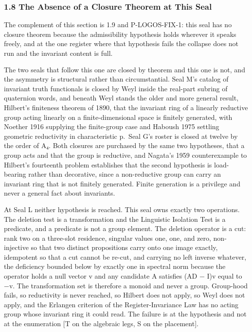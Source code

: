 \documentclass[10pt,twocolumn]{article}
\begin{document}
\hypertarget{the-absence-of-a-closure-theorem-at-this-seal}{%
\subsubsection{1.8 The Absence of a Closure Theorem at This
Seal}\label{the-absence-of-a-closure-theorem-at-this-seal}}

The complement of this section is 1.9 and P-LOGOS-FIX-1: this seal has
no closure theorem because the admissibility hypothesis holds wherever
it speaks freely, and at the one register where that hypothesis fails
the collapse does not run and the invariant content is full.

The two seals that follow this one are closed by theorem and this one is
not, and the asymmetry is structural rather than circumstantial. Seal
M's catalog of invariant truth functionals is closed by Weyl inside the
real-part subring of quaternion words, and beneath Weyl stands the older
and more general result, Hilbert's finiteness theorem of 1890, that the
invariant ring of a linearly reductive group acting linearly on a
finite-dimensional space is finitely generated, with Noether 1916
supplying the finite-group case and Haboush 1975 settling geometric
reductivity in characteristic p.~Seal G's roster is closed at twelve by
the order of A₄. Both closures are purchased by the same two hypotheses,
that a group acts and that the group is reductive, and Nagata's 1959
counterexample to Hilbert's fourteenth problem establishes that the
second hypothesis is load-bearing rather than decorative, since a
non-reductive group can carry an invariant ring that is not finitely
generated. Finite generation is a privilege and never a general fact
about invariants.

At Seal L neither hypothesis is reached. This seal owns exactly two
operations. The deletion test is a transformation and the Linguistic
Isolation Test is a predicate, and a predicate is not a group element.
The deletion operator is a cut: rank two on a three-slot residence,
singular values one, one, and zero, non-injective so that two distinct
propositions carry onto one image exactly, idempotent so that a cut
cannot be re-cut, and carrying no left inverse whatever, the deficiency
bounded below by exactly one in spectral norm because the operator holds
a null vector v and any candidate A satisfies (AD − I)v equal to −v. The
transformation set is therefore a monoid and never a group. Group-hood
fails, so reductivity is never reached, so Hilbert does not apply, so
Weyl does not apply, and the Erlangen criterion of the
Register-Invariance Law has no acting group whose invariant ring it
could read. The failure is at the hypothesis and not at the enumeration
{[}T on the algebraic legs, S on the placement{]}.
\end{document}

